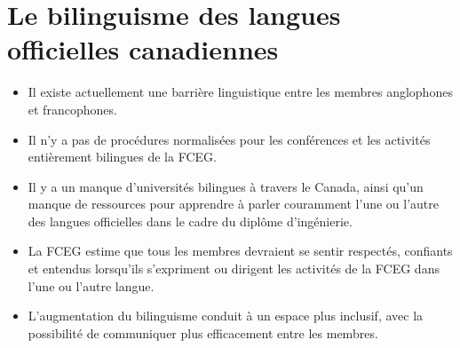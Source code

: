\section{Le bilinguisme des langues officielles canadiennes}\label{le-bilinguisme-des-langues-officielles-canadiennes}



\begin{itemize}
 \item Il existe actuellement une barrière linguistique entre les membres anglophones et francophones.
 \item Il n'y a pas de procédures normalisées pour les conférences et les activités entièrement bilingues de la FCEG.
 \item Il y a un manque d'universités bilingues à travers le Canada, ainsi qu'un manque de ressources pour apprendre à parler couramment l'une ou l'autre des langues officielles dans le cadre du diplôme d'ingénierie.
 \item La FCEG estime que tous les membres devraient se sentir respectés, confiants et entendus lorsqu'ils s'expriment ou dirigent les activités de la FCEG dans l'une ou l'autre langue.
 \item L'augmentation du bilinguisme conduit à un espace plus inclusif, avec la possibilité de communiquer plus efficacement entre les membres.
\end{itemize}

